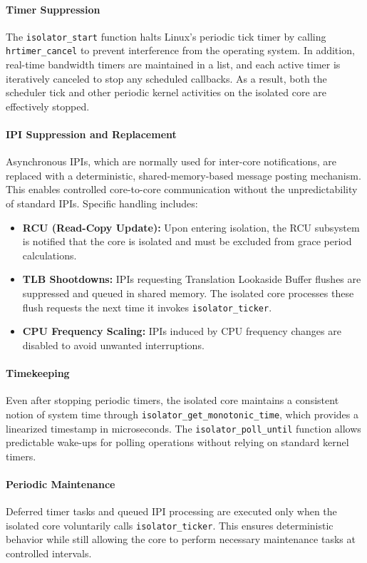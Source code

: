 \documentclass[letterpaper]{article}
\begin{document}
\paragraph{Timer Suppression}  
The \texttt{isolator\_start} function halts Linux’s periodic tick timer by calling \texttt{hrtimer\_cancel} to
prevent interference from the operating system. In addition, real-time bandwidth timers are maintained in a list,
and each active timer is iteratively canceled to stop any scheduled callbacks. As a result, both the scheduler tick
and other periodic kernel activities on the isolated core are effectively stopped.

\paragraph{IPI Suppression and Replacement}  
Asynchronous IPIs, which are normally used for inter-core notifications, are replaced with a deterministic,
shared-memory-based message posting mechanism. This enables controlled core-to-core communication without
the unpredictability of standard IPIs. Specific handling includes:
\begin{itemize}
    \item \textbf{RCU (Read-Copy Update):} Upon entering isolation, the RCU subsystem is notified that the core is isolated and must be excluded from grace period calculations. 
    \item \textbf{TLB Shootdowns:} IPIs requesting Translation Lookaside Buffer flushes are suppressed and queued in shared memory.
      The isolated core processes these flush requests the next time it invokes \texttt{isolator\_ticker}.
    \item \textbf{CPU Frequency Scaling:} IPIs induced by CPU frequency changes are disabled to avoid unwanted interruptions.
\end{itemize}

\paragraph{Timekeeping}  
Even after stopping periodic timers, the isolated core maintains a consistent notion of system time through \texttt{isolator\_get\_monotonic\_time}, which provides a linearized timestamp in microseconds. The \texttt{isolator\_poll\_until} function allows predictable wake-ups for polling operations without relying on standard kernel timers.

\paragraph{Periodic Maintenance}  
Deferred timer tasks and queued IPI processing are executed only when the isolated core voluntarily calls \texttt{isolator\_ticker}. This ensures deterministic behavior while still allowing the core to perform necessary maintenance tasks at controlled intervals.
\end{document}
